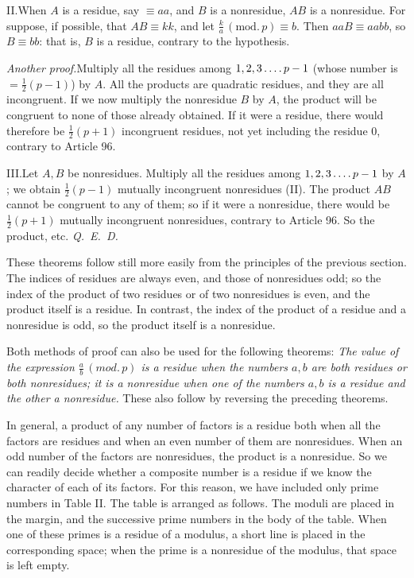 II.\quad When $A$ is a residue, say $\equiv aa$, and $B$ is a nonresidue, $AB$ is a nonresidue. For suppose, if possible, that $AB\equiv kk$, and let $\frac{k}{a}\,(\mathrm{mod.}\,p)\equiv b$. Then $aaB\equiv aabb$, so $B\equiv bb$: that is, $B$ is a residue, contrary to the hypothesis.

\emph{Another proof.}\quad Multiply all the residues among $1,2,3\mathinner{\ldotp\ldotp\ldotp\ldotp} p-1$ (whose number is $=\tfrac12(p-1)$) by $A$. All the products are quadratic residues, and they are all incongruent. If we now multiply the nonresidue $B$ by $A$, the product will be congruent to none of those already obtained. If it were a residue, there would therefore be $\tfrac12(p+1)$ incongruent residues, not yet including the residue $0$, contrary to Article 96.

III.\quad Let $A,B$ be nonresidues. Multiply all the residues among $1,2,3\mathinner{\ldotp\ldotp\ldotp\ldotp} p-1$ by $A$; we obtain $\tfrac12(p-1)$ mutually incongruent nonresidues (II). The product $AB$ cannot be congruent to any of them; so if it were a nonresidue, there would be $\tfrac12(p+1)$ mutually incongruent nonresidues, contrary to Article 96. So the product, etc. \mbox{\emph{Q. E. D.}}

These theorems follow still more easily from the principles of the previous section. The indices of residues are always even, and those of nonresidues odd; so the index of the product of two residues or of two nonresidues is even, and the product itself is a residue. In contrast, the index of the product of a residue and a nonresidue is odd, so the product itself is a nonresidue.

Both methods of proof can also be used for the following theorems: \emph{The value of the expression $\frac{a}{b}\,(\mathit{mod.}\,p)$ is a residue when the numbers $a,b$ are both residues or both nonresidues; it is a nonresidue when one of the numbers $a,b$ is a residue and the other a nonresidue.} These also follow by reversing the preceding theorems.

In general, a product of any number of factors is a residue both when all the factors are residues and when an even number of them are nonresidues. When an odd number of the factors are nonresidues, the product is a nonresidue. So we can readily decide whether a composite number is a residue if we know the character of each of its factors. For this reason, we have included only prime numbers in Table II. The table is arranged as follows. The moduli are placed in the margin, and the successive prime numbers in the body of the table. When one of these primes is a residue of a modulus, a short line is placed in the corresponding space; when the prime is a nonresidue of the modulus, that space is left empty.

